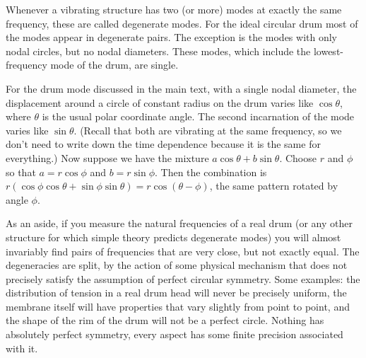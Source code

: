   Whenever a vibrating structure has two (or more) modes at exactly the same 
  frequency, these are called degenerate modes. For the ideal circular drum 
  most of the modes appear in degenerate pairs. The exception is the modes with 
  only nodal circles, but no nodal diameters. These modes, which include the 
  lowest-frequency mode of the drum, are single. 

  For the drum mode discussed in the main text, with a single nodal diameter, 
  the displacement around a circle of constant radius on the drum varies like 
  $\cos \theta$, where $\theta$ is the usual polar coordinate angle. The second 
  incarnation of the mode varies like $\sin \theta$. (Recall that both are 
  vibrating at the same frequency, so we don't need to write down the time 
  dependence because it is the same for everything.) Now suppose we have the 
  mixture $a\cos\theta+b\sin\theta$. Choose $r$ and $\phi$ so that 
  $a=r\cos\phi$ and $b=r\sin\phi$. Then the combination is $r \left(\cos\phi 
  \cos\theta+\sin\phi \sin\theta\right)=r\cos\left(\theta-\phi \right)$, the 
  same pattern rotated by angle $\phi$. 

  As an aside, if you measure the natural frequencies of a real drum (or any 
  other structure for which simple theory predicts degenerate modes) you will 
  almost invariably find pairs of frequencies that are very close, but not 
  exactly equal. The degeneracies are split, by the action of some physical 
  mechanism that does not precisely satisfy the assumption of perfect circular 
  symmetry. Some examples: the distribution of tension in a real drum head will 
  never be precisely uniform, the membrane itself will have properties that 
  vary slightly from point to point, and the shape of the rim of the drum will 
  not be a perfect circle. Nothing has absolutely perfect symmetry, every 
  aspect has some finite precision associated with it. 